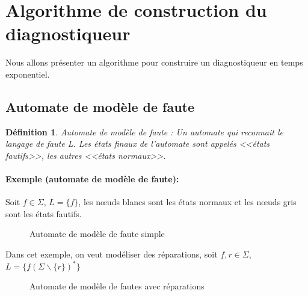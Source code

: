 \documentclass[10pt,a4paper]{article}
\newtheorem {mydef} {D\'efinition}
\begin{document}

\section{Algorithme de construction du diagnostiqueur}
    Nous allons présenter un algorithme pour construire un diagnostiqueur en temps exponentiel.
        \subsection{Automate de mod\`ele de faute}
   \begin{mydef}{Automate de mod\`ele de faute : }
 Un automate qui reconnait le langage de faute L. Les états finaux de l'automate sont appelés <<\'etats fautifs>>, les autres <<\'etats normaux>>.
 \end{mydef}
    
    \paragraph{Exemple (automate de mod\`ele de faute): } %
    
   Soit $f\in \Sigma$, $L  = \{f\}$, les  nœuds blancs sont les états normaux et les nœuds gris sont les \'etats fautifs. 
        \begin{figure}[H]
                \centering
                \caption{Automate de mod\`ele de faute simple}
        \end{figure}
Dans cet exemple, on veut modéliser des réparations, soit $f, r \in \Sigma$, $L  = \{f (\Sigma\backslash \{ r \})^* \}$        
        \begin{figure}[H]
                \centering
                \caption{Automate de mod\`ele de fautes avec r\'eparations} 
    \end{figure}
            
\end{document}
